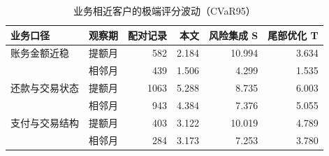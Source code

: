 \begin{table}[H]\centering\caption{业务相近客户的极端评分波动（CVaR95）}
\fontsize{9bp}{12bp}\selectfont
\begin{tabularx}{\linewidth}{@{}Ylrrrr@{}}\toprule
业务口径 & 观察期 & 配对记录 & 本文 & 风险集成 S & 尾部优化 T\\\midrule
账务金额近稳 & 提额月 & 582 & 2.184 & 10.994 & 3.634\\
 & 相邻月 & 439 & 1.506 & 4.299 & 1.535\\
\addlinespace[2bp]
还款与交易状态 & 提额月 & 1063 & 5.288 & 8.735 & 6.003\\
 & 相邻月 & 943 & 4.384 & 7.376 & 5.055\\
\addlinespace[2bp]
支付与交易结构 & 提额月 & 403 & 3.122 & 10.019 & 4.789\\
 & 相邻月 & 284 & 3.173 & 7.253 & 3.780\\
\bottomrule\end{tabularx}
\end{table}